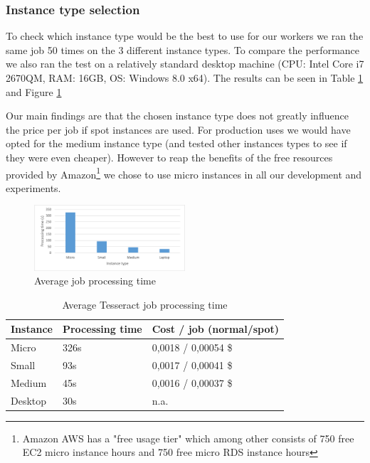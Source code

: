 \documentclass[a4paper]{IEEEtran}
\begin{document}
\subsubsection{Instance type selection}

To check which instance type would be the best to use for our workers we ran the same job 50 times on the 3 different instance types. To compare the performance we also ran the test on a relatively standard desktop machine (CPU: Intel Core i7 2670QM, RAM: 16GB, OS: Windows 8.0 x64). The results can be seen in Table \ref{tesperfresults} and Figure \ref{fig_tesperfresults}

Our main findings are that the chosen instance type does not greatly influence the price per job if spot instances are used. For production uses we would have opted for the medium instance type (and tested other instances types to see if they were even cheaper). However to reap the benefits of the free resources provided by Amazon\footnote{Amazon AWS has a "free usage tier" which among other consists of 750 free EC2 micro instance hours and 750 free micro RDS instance hours} we chose to use micro instances in all our development and experiments.
\newline

\begin{figure}
\centering
\includegraphics[width=0.5\textwidth]{"results-tesseract"}
\caption{Average job processing time}
\label{fig_tesperfresults}
\end{figure}

\begin{table}
\caption{Average Tesseract job processing time}
\label{tesperfresults}
\centering
\begin{tabular}{| l | l | l |}
\hline
Instance & Processing time & Cost / job (normal/spot) \\ \hline
Micro & 326s & 0,0018 / 0,00054 \$ \\ \hline
Small & 93s & 0,0017 / 0,00041 \$ \\ \hline
Medium & 45s & 0,0016 / 0,00037 \$ \\ \hline
Desktop & 30s & n.a. \\ \hline
\end{tabular}
\end{table}
\end{document}
